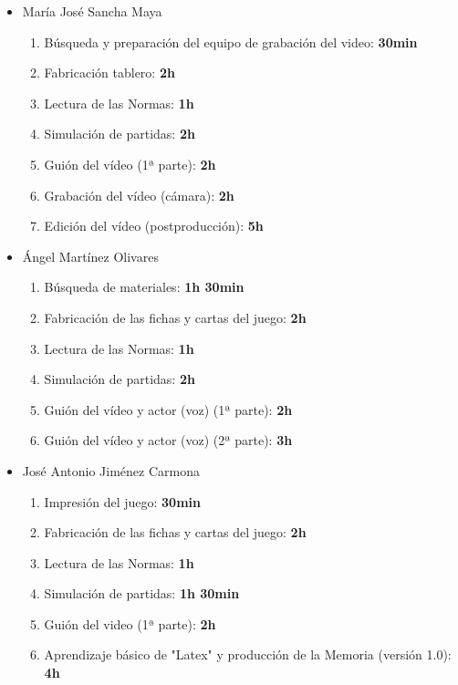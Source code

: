 \documentclass[11 pt]{book}
\begin{document}
\begin{itemize}
			    \item María José Sancha Maya
				    \begin{enumerate}
					    \item Búsqueda y preparación del equipo de grabación del video: \textbf{30min}
					    \item Fabricación tablero: \textbf{2h}
					    \item Lectura de las Normas: \textbf{1h}
					    \item Simulación de partidas: \textbf{2h}
					    \item Guión del vídeo (1ª parte): \textbf{2h}
					    \item Grabación del vídeo (cámara): \textbf{2h}
					    \item Edición del vídeo (postproducción): \textbf{5h}
				    \end{enumerate}
			    \item Ángel Martínez Olivares
				    \begin{enumerate}
					    \item Búsqueda de materiales: \textbf{1h 30min}
					    \item Fabricación de las fichas y cartas del juego: \textbf{2h}
					    \item Lectura de las Normas: \textbf{1h}
					    \item Simulación de partidas: \textbf{2h}
					    \item Guión del vídeo y actor (voz) (1ª parte): \textbf{2h}
					    \item Guión del vídeo y actor (voz) (2ª parte): \textbf{3h}
				    \end{enumerate}
			    \item José Antonio Jiménez Carmona
				    \begin{enumerate}
					    \item Impresión del juego: \textbf{30min}
					    \item Fabricación de las fichas y cartas del juego: \textbf{2h}
					    \item Lectura de las Normas: \textbf{1h}
					    \item Simulación de partidas: \textbf{1h 30min}
					    \item Guión del video (1ª parte): \textbf{2h}
					    \item Aprendizaje básico de "Latex" y producción de la Memoria (versión 1.0): \textbf{4h}
				    \end{enumerate}
		    \end{itemize}
		    
\end{document}
